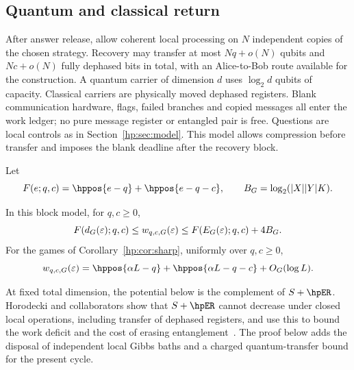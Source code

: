 \subsection{Quantum and classical return}\label{hp:sec:recovery}
After answer release, allow coherent local processing on $N$ independent copies of the chosen strategy. Recovery may transfer at most $Nq+o(N)$ qubits and $Nc+o(N)$ fully dephased bits in total, with an Alice-to-Bob route available for the construction. A quantum carrier of dimension $d$ uses $\log_2d$ qubits of capacity. Classical carriers are physically moved dephased registers. Blank communication hardware, flags, failed branches and copied messages all enter the work ledger; no pure message register or entangled pair is free. Questions are local controls as in Section~\ref{hp:sec:model}. This model allows compression before transfer and imposes the blank deadline after the recovery block.

Let
\[
 F(e;q,c)=\hppos{e-q}+\hppos{e-q-c},\qquad
 B_G=\log_2(|X||Y|K).
\]
\begin{theorem}\label{hp:thm:return}
In this block model, for $q,c\ge0$,
\begin{equation}
 F(d_G(\varepsilon);q,c)\le w_{q,c,G}(\varepsilon)
 \le F(E_G(\varepsilon);q,c)+4B_G.\label{hp:eq:return}
\end{equation}
For the games of Corollary~\ref{hp:cor:sharp}, uniformly over $q,c\ge0$,
\begin{equation}
 w_{q,c,G}(\eps)
 =\hppos{\alpha L-q}+\hppos{\alpha L-q-c}+O_G(\log L).
 \label{hp:eq:returnsharp}
\end{equation}
\end{theorem}

At fixed total dimension, the potential below is the complement of $S+\hpER$. Horodecki and collaborators show that $S+\hpER$ cannot decrease under closed local operations, including transfer of dephased registers, and use this to bound the work deficit and the cost of erasing entanglement~\cite[Theorems 2 and 3 and the proof of Theorem 3]{HPlocalnonlocal}. The proof below adds the disposal of independent local Gibbs baths and a charged quantum-transfer bound for the present cycle.

